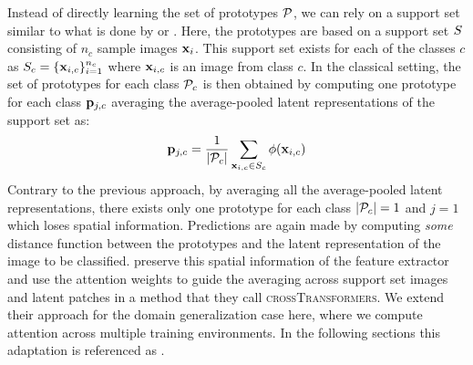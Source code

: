 Instead of directly learning the set of prototypes $\mathcal{P}$, we can rely on a support set similar to what is done by \citet{DoerschGZ20} or \citet{SnellSZ17}. Here, the prototypes are based on a support set $S$ consisting of $n_c$ sample images $\mathbf{x}_i$. This support set exists for each of the classes $c$ as $S_c = \{\mathbf{x}_{i,c}\}_{i=1}^{n_c}$ where $\mathbf{x}_{i,c}$ is an image from class $c$. In the classical setting, the set of prototypes for each class $\mathcal{P}_c$ is then obtained by computing one prototype for each class $\mathbf{p}_{j,c}$ averaging the average-pooled latent representations of the support set as:
\begin{equation}
    \mathbf{p}_{j,c} = \frac{1}{|\mathcal{P}_c|} \sum_{\mathbf{x}_{i,c} \in S_c} \phi(\mathbf{x}_{i,c})
\end{equation}
Contrary to the previous approach, by averaging all the average-pooled latent representations, there exists only one prototype for each class \ie $|\mathcal{P}_c| = 1$ and $j=1$ which loses spatial information. Predictions are again made by computing \emph{some} distance function between the prototypes and the latent representation of the image to be classified. \citet{DoerschGZ20} preserve this spatial information of the feature extractor and use the attention weights to guide the averaging across support set images and latent patches in a method that they call \textsc{crossTransformers}. We extend their approach for the domain generalization case here, where we compute attention across multiple training environments. In the following sections this adaptation is referenced as \dtransformers. 

